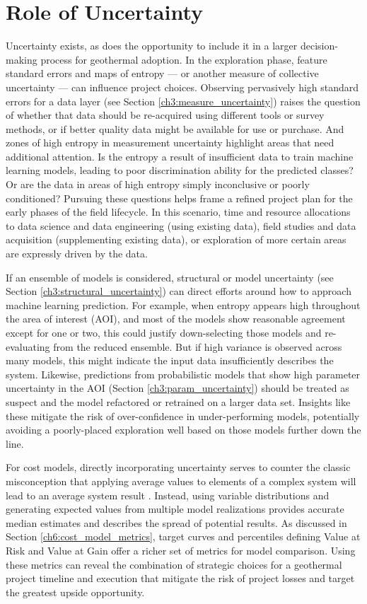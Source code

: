 \section{Role of Uncertainty}\label{ch7:uncertainty_role}
Uncertainty exists, as does the opportunity to include it in a larger decision-making process for geothermal adoption. In the exploration phase, feature standard errors and maps of entropy --- or another measure of collective uncertainty --- can influence project choices. Observing pervasively high standard errors for a data layer (see Section \ref{ch3:measure_uncertainty}) raises the question of whether that data should be re-acquired using different tools or survey methods, or if better quality data might be available for use or purchase. And zones of high entropy in measurement uncertainty highlight areas that need additional attention. Is the entropy a result of insufficient data to train machine learning models, leading to poor discrimination ability for the predicted classes? Or are the data in areas of high entropy simply inconclusive or poorly conditioned? Pursuing these questions helps frame a refined project plan for the early phases of the field lifecycle. In this scenario, time and resource allocations to data science and data engineering (using existing data), field studies and data acquisition (supplementing existing data), or exploration of more certain areas are expressly driven by the data.

If an ensemble of models is considered, structural or model uncertainty (see Section \ref{ch3:structural_uncertainty}) can direct efforts around how to approach machine learning prediction. For example, when entropy appears high throughout the area of interest (AOI), and most of the models show reasonable agreement except for one or two, this could justify down-selecting those models and re-evaluating from the reduced ensemble. But if high variance is observed across many models, this might indicate the input data insufficiently describes the system. Likewise, predictions from probabilistic models that show high parameter uncertainty in the AOI (Section \ref{ch3:param_uncertainty}) should be treated as suspect and the model refactored or retrained on a larger data set. Insights like these mitigate the risk of over-confidence in under-performing models, potentially avoiding a poorly-placed exploration well based on those models further down the line.

For cost models, directly incorporating uncertainty serves to counter the classic misconception that applying average values to elements of a complex system will lead to an average system result \citep[Flaw of Averages,][p.\ 17-19]{de_neufville_flexibility_2011}. Instead, using variable distributions and generating expected values from multiple model realizations provides accurate median estimates and describes the spread of potential results. As discussed in Section \ref{ch6:cost_model_metrics}, target curves and percentiles defining Value at Risk and Value at Gain offer a richer set of metrics for model comparison. Using these metrics can reveal the combination of strategic choices for a geothermal project timeline and execution that mitigate the risk of project losses and target the greatest upside opportunity.

